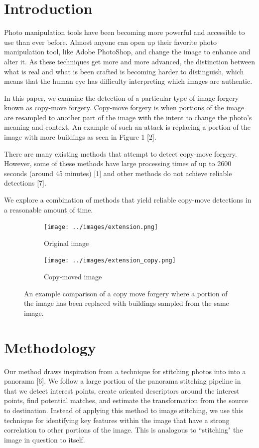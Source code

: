 \documentclass[12pt]{article}
\begin{document}
\section*{Introduction}
Photo manipulation tools have been becoming more powerful and accessible to use than ever before. Almost anyone can open up their favorite photo manipulation tool, like Adobe PhotoShop, and change the image to enhance and alter it. As these techniques get more and more advanced, the distinction between what is real and what is been crafted is becoming harder to distinguish, which means that the human eye has difficulty interpreting which images are authentic.

In this paper, we examine the detection of a particular type of image forgery known as copy-move forgery. Copy-move forgery is when portions of the image are resampled to another part of the image with the intent to change the photo's meaning and context. An example of such an attack is replacing a portion of the image with more buildings as seen in Figure 1 [2].

There are many existing methods that attempt to detect copy-move forgery. However, some of these methods have large processing times of up to 2600 seconds (around 45 minutes) [1] and other methods do not achieve reliable detections [7].

We explore a combination of methods that yield reliable copy-move detections in a reasonable amount of time.


\begin{figure}
\centering
\begin{subfigure}{.5\textwidth}
  \centering
  \texttt{[image: ../images/extension.png]}
  \caption{Original image}
  \label{fig:sub1}
\end{subfigure}%
\begin{subfigure}{.5\textwidth}
  \centering
  \texttt{[image: ../images/extension\_copy.png]}
  \caption{Copy-moved image}
  \label{fig:sub2}
\end{subfigure}
\caption{An example comparison of a copy move forgery where a portion of the image has been replaced with buildings sampled from the same image.}
\label{fig:test}
\end{figure}


\section*{Methodology}
Our method draws inspiration from a technique for stitching photos into into a panorama [6]. We follow a large portion of the panorama stitching pipeline in that we detect interest points, create oriented descriptors around the interest points, find potential matches, and estimate the transformation from the source to destination. Instead of applying this method to image stitching, we use this technique for identifying key features within the image that have a strong correlation to other portions of the image. This is analogous to ``stitching" the image in question to itself.
\end{document}
